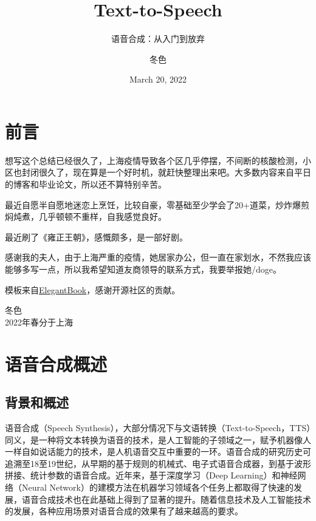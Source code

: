 \documentclass[cn,10pt,math=newtx,citestyle=gb7714-2015,bibstyle=gb7714-2015]{elegantbook}
\title{Text-to-Speech}
\subtitle{语音合成：从入门到放弃}
\author{冬色}
\institute{https://github.com/cnlinxi}
\date{March 20, 2022}
\begin{document}
\maketitle
\frontmatter

\chapter*{前言}


想写这个总结已经很久了，上海疫情导致各个区几乎停摆，不间断的核酸检测，小区也封闭很久了，现在算是一个好时机，就赶快整理出来吧。大多数内容来自平日的博客和毕业论文，所以还不算特别辛苦。

最近自愿半自愿地迷恋上烹饪，比较自豪，零基础至少学会了20+道菜，炒炸爆煎焖炖煮，几乎顿顿不重样，自我感觉良好。

最近刷了《雍正王朝》，感慨颇多，是一部好剧。

感谢我的夫人，由于上海严重的疫情，她居家办公，但一直在家划水，不然我应该能够多写一点，所以我希望知道友商领导的联系方式，我要举报她/doge。

\vskip 0.5cm

模板来自\href{https://github.com/ElegantLaTeX/ElegantBook}{ElegantBook}，感谢开源社区的贡献。

\vskip 1.5cm

\begin{flushright}
冬色\\
2022年春分于上海
\end{flushright}

\tableofcontents

\mainmatter

\chapter{语音合成概述}

\section{背景和概述}
语音合成（Speech Synthesis），大部分情况下与文语转换（Text-to-Speech，TTS）同义，是一种将文本转换为语音的技术，是人工智能的子领域之一，赋予机器像人一样自如说话能力的技术，是人机语音交互中重要的一环。语音合成的研究历史可追溯至18至19世纪，从早期的基于规则的机械式、电子式语音合成器，到基于波形拼接、统计参数的语音合成。近年来，基于深度学习（Deep Learning）和神经网络（Neural Network）的建模方法在机器学习领域各个任务上都取得了快速的发展，语音合成技术也在此基础上得到了显著的提升。随着信息技术及人工智能技术的发展，各种应用场景对语音合成的效果有了越来越高的要求。
\end{document}
